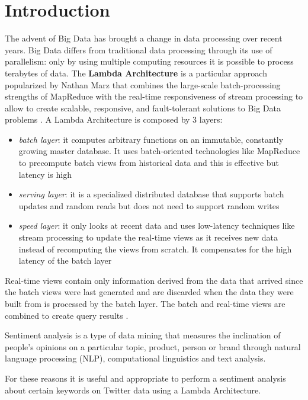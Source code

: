 \documentclass[10pt,twocolumn,letterpaper]{article}
\begin{document}
\section{Introduction}
The advent of Big Data has brought a change in data processing over recent years. Big Data differs from traditional data processing through its use of parallelism: only by using multiple computing resources it is possible to process terabytes of data. The \textbf{Lambda Architecture} is a particular approach popularized by Nathan Marz that combines the large-scale batch-processing strengths of MapReduce with the real-time responsiveness of stream processing to allow to create scalable, responsive, and fault-tolerant solutions to Big Data problems \cite{butcher2014seven}. A Lambda Architecture is composed by 3 layers:
\begin{itemize}
\item \emph{batch layer}: it computes arbitrary functions on an immutable, constantly growing master database. It uses batch-oriented technologies like MapReduce to precompute batch views from historical data and this is effective but latency is high
\item \emph{serving layer}: it is a specialized distributed database that supports batch updates and random reads but does not need to support random writes
\item \emph{speed layer}: it only looks at recent data and uses low-latency techniques like stream processing to update the real-time views as it receives new data instead of recomputing the views from scratch. It compensates for the high latency of the batch layer
\end{itemize}
Real-time views contain only information derived from the data that arrived since the batch views were last generated and are discarded when the data they were built from is processed by the batch layer. The batch and real-time views are combined to create query results \cite{marz2015big}.

Sentiment analysis is a type of data mining that measures the inclination of people's opinions on a particular topic, product, person or brand through natural language processing (NLP), computational linguistics and text analysis.

For these reasons it is useful and appropriate to perform a sentiment analysis about certain keywords on Twitter data  using a Lambda Architecture.

\end{document}
